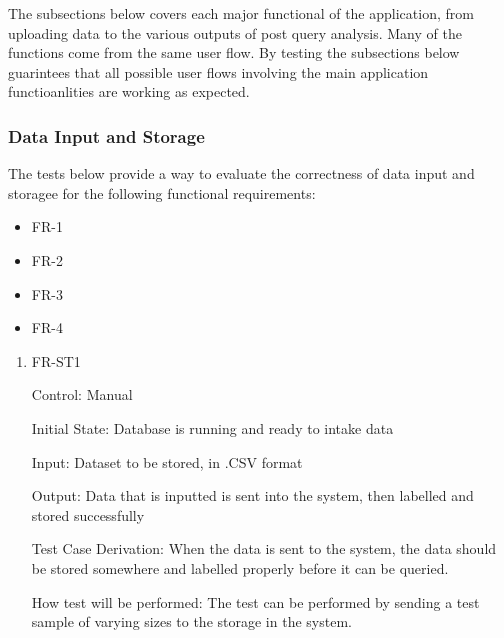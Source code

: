 \documentclass[12pt, titlepage]{article}
\begin{document}
The subsections below covers each major functional of the application, from uploading
data to the various outputs of post query analysis. Many of the functions come from the
same user flow. By testing the subsections below guarintees that all possible user flows
involving the main application functioanlities are working as expected. 

\subsubsection{Data Input and Storage}
The tests below provide a way to evaluate the correctness of data input and storagee for
the following functional requirements:
\begin{itemize}
  \item FR-1
  \item FR-2
  \item FR-3
  \item FR-4
\end{itemize}

\begin{enumerate}

\item{FR-ST1}

Control: Manual
					
Initial State: Database is running and ready to intake data
					
Input: Dataset to be stored, in .CSV format
					
Output: Data that is inputted is sent into the system, then labelled and stored successfully

Test Case Derivation: When the data is sent to the system, the data should be stored somewhere and labelled properly before it can be queried.
					
How test will be performed: The test can be performed by sending a test sample of varying sizes to the storage in the system.

\end{enumerate}
\end{document}
